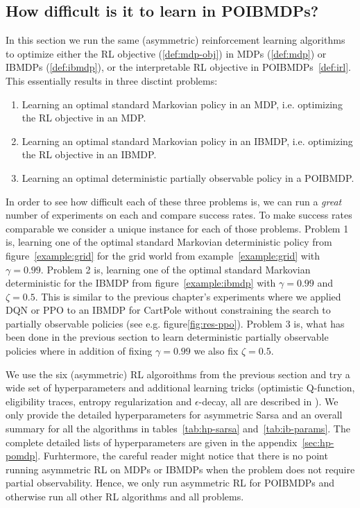 \subsection{How difficult is it to learn in POIBMDPs?}\label{sec:how-diff}

In this section we run the same (asymmetric) reinforcement learning algorithms to optimize either the RL objective (\ref{def:mdp-obj}) in MDPs (\ref{def:mdp}) or IBMDPs (\ref{def:ibmdp}), or the interpretable RL objective in POIBMDPs~\ref{def:irl}.
This essentially results in three disctint problems:
\begin{enumerate}
    \item Learning an optimal standard Markovian policy in an MDP, i.e. optimizing the RL objective in an MDP.
    \item Learning an optimal standard Markovian policy in an IBMDP, i.e. optimizing the RL objective in an IBMDP.
    \item Learning an optimal deterministic partially observable policy in a POIBMDP.
\end{enumerate}

In order to see how difficult each of these three problems is, we can run a \textit{great} number of experiments on each and compare success rates.
To make success rates comparable we consider a unique instance for each of those problems.
Problem 1 is, learning one of the optimal standard Markovian deterministic policy from figure~\ref{example:grid} for the grid world from example~\ref{example:grid} with $\gamma=0.99$.
Problem 2 is, learning one of the optimal standard Markovian deterministic for the IBMDP from figure~\ref{example:ibmdp} with $\gamma=0.99$ and $\zeta=0.5$.
This is similar to the previous chapter's experiments where we applied DQN or PPO to an IBMDP for CartPole without constraining the search to partially observable policies (see e.g. figure\ref{fig:res-ppo}).
Problem 3 is, what has been done in the previous section to learn deterministic partially observable policies where in addition of fixing $\gamma=0.99$ we also fix $\zeta=0.5$.

We use the six (asymmetric) RL algoroithms from the previous section and try a wide set of hyperparameters and additional learning tricks (optimistic Q-function, eligibility traces, entropy regularization and $\epsilon$-decay, all are described in \cite{sutton}).
We only provide the detailed hyperparameters for asymmetric Sarsa and an overall summary for all the algorithms in tables~\ref{tab:hp-sarsa} and~\ref{tab:ib-params}.
The complete detailed lists of hyperparameters are given in the appendix~\ref{sec:hp-pomdp}.
Furhtermore, the careful reader might notice that there is no point running asymmetric RL on MDPs or IBMDPs when the problem does not require partial observability.
Hence, we only run asymmetric RL for POIBMDPs and otherwise run all other RL algorithms and all problems.

